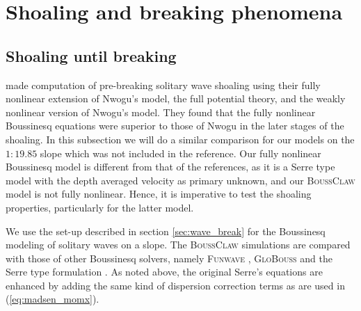 \documentclass[review]{elsarticle}
\newcommand{\BoussClaw}{\textsc{BoussClaw} }
\begin{document}


\section{Shoaling and breaking phenomena}
\label{sec:shoaling_breaking}

\subsection{Shoaling until breaking}
\label{sec:num_shoaling}
\citet{wei1995fully} made computation of pre-breaking solitary wave shoaling using
 their fully nonlinear extension of Nwogu's model, the full potential 
theory, and the weakly nonlinear version of Nwogu's model.
They found that the fully nonlinear Boussinesq equations were superior to those of Nwogu in the later stages of the shoaling.
In this subsection we will do a similar comparison for our models on the $1:19.85$ slope which was not included in the reference. Our fully nonlinear Boussinesq model is different from that of the references, as it is a Serre type model with the depth averaged velocity as primary unknown, 
and our  \BoussClaw model is not fully nonlinear. Hence, it is imperative
to test the shoaling properties, particularly for the latter model.   
 
We use the set-up described in section \ref{sec:wave_break} for the Boussinesq modeling of solitary waves on a slope. 
The \BoussClaw simulations are compared
with those of other Boussinesq solvers, namely
 \textsc{Funwave} \citep{shi2012high}, \textsc{GloBouss} \citep{lovholt2010coupling} and the Serre type formulation \citep{Lovholt:2013a}.
As noted above, 
the original Serre's equations are enhanced by adding the same kind of dispersion correction terms as are used in 
(\ref{eq:madsen_momx}). 
\end{document}
